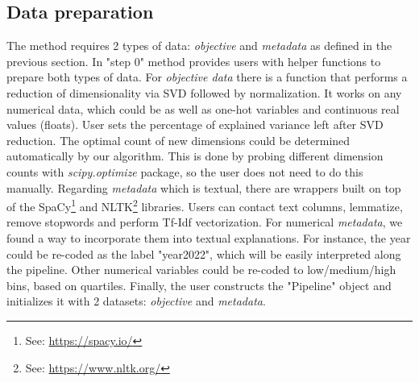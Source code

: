 \documentclass[
 twocolumn,
 hf,
]{ceurart}
\begin{document}
\subsection{Data preparation}\label{subsec:data-preparation}
The method requires 2 types of data: \textit{objective} and \textit{metadata} as defined in the previous section.
In "step 0" method provides users with helper functions to prepare both types of data.
For \textit{objective data} there is a function that performs a reduction of dimensionality via SVD followed by normalization.
It works on any numerical data, which could be as well as one-hot variables and continuous real values (floats).
User sets the percentage of explained variance left after SVD reduction.
The optimal count of new dimensions could be determined automatically by our algorithm.
This is done by probing different dimension counts with \textit{scipy.optimize} package, so the user does not need to do this manually.
Regarding \textit{metadata} which is textual, there are wrappers built on top of the SpaCy\footnote{See: \url{https://spacy.io/}} and NLTK\footnote{See: \url{https://www.nltk.org/}} libraries.
Users can contact text columns, lemmatize, remove stopwords and perform Tf-Idf vectorization.
For numerical \textit{metadata}, we found a way to incorporate them into textual explanations.
For instance, the year could be re-coded as the label "year2022", which will be easily interpreted along the pipeline.
Other numerical variables could be re-coded to low/medium/high bins, based on quartiles.
Finally, the user constructs the "Pipeline" object and initializes it with 2 datasets: \textit{objective} and \textit{metadata}.
\end{document}
